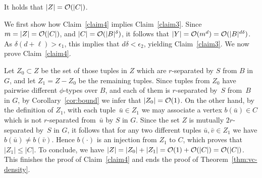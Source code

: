   \begin{claim}\label{claim4}
It holds that $|Z|=\mathcal{O}(|C|)$.
  \end{claim}
  
  We first show how Claim~\ref{claim4} implies Claim~\ref{claim3}.
  Since $m=|Z|=\mathcal{O}(|C|)$,
  and $|C|=\mathcal{O}(|B|^\delta)$,
  it follows that $|Y|=\mathcal{O}(m^d)=\mathcal{O}(|B|^{d\delta})$. As $\delta(d+\ell)>\epsilon_1$, this implies that $d\delta<\epsilon_2$, yielding Claim~\ref{claim3}.
  We now prove Claim~\ref{claim4}.

\medskip
  Let $Z_0\subset Z$ be the set of 
  those tuples in $Z$ which are $r$-separated by $S$ from $B$ in $G$,
  and let $Z_1=Z-Z_0$ be the remaining  tuples.
  Since tuples from $Z_0$ have pairwise different $\phi$-types over $B$, and each of them is $r$-separated by~$S$ from~$B$ in $G$, by Corollary~\ref{cor:bound} we infer that $|Z_0|=\mathcal{O}(1)$.  
 On the other hand, by the definition of $Z_1$, with each tuple~$\bar u\in Z_1$ we may associate a vertex $b(\bar u)\in C$ which is not $r$-separated from~$\bar u$ by $S$ in $G$.
 Since the set $Z$ is mutually $2r$-separated by~$S$ in $G$, it follows that for any two different tuples $\bar u,\bar v\in Z_1$ we have $b(\bar u)\neq b(\bar v)$.
 Hence $b(\cdot)$ is an injection from $Z_1$ to $C$, which proves that $|Z_1|\leq |C|$.
 To conclude, we have $|Z|=|Z_0|+|Z_1|=\mathcal{O}(1)+\mathcal{O}(|C|)=\mathcal{O}(|C|)$. This finishes the proof of Claim~\ref{claim4} and ends the proof of Theorem~\ref{thm:vc-density}.

